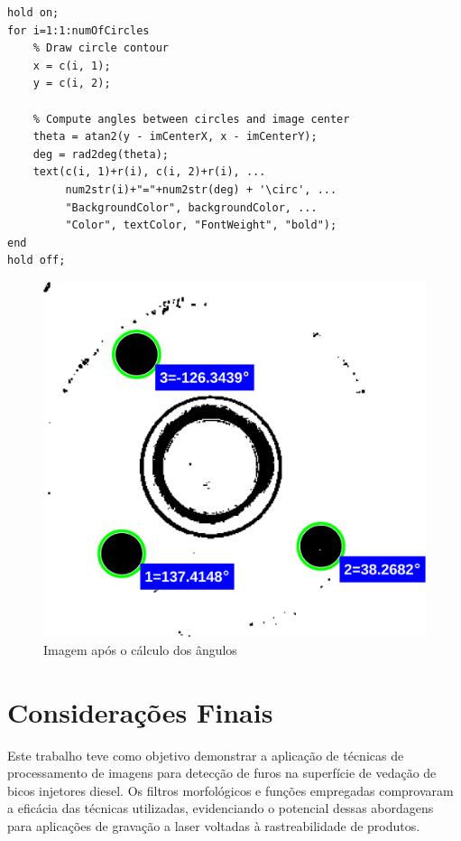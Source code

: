 \documentclass[conference]{IEEEtran}
\begin{document}
\begin{lstlisting}[caption={Cálculo dos ângulos em relação ao centro da imagem}, label={lst:codigo-compute-angle}]
hold on;
for i=1:1:numOfCircles
	% Draw circle contour
	x = c(i, 1);
	y = c(i, 2);
	
	% Compute angles between circles and image center 
	theta = atan2(y - imCenterX, x - imCenterY);
	deg = rad2deg(theta);
	text(c(i, 1)+r(i), c(i, 2)+r(i), ...
		 num2str(i)+"="+num2str(deg) + '\circ', ...
		 "BackgroundColor", backgroundColor, ...
		 "Color", textColor, "FontWeight", "bold");
end
hold off;
\end{lstlisting}

\begin{figure}[b]
	\centering
	\includegraphics[scale=0.65]{Images/Image0000_computed.png}
	\caption{Imagem após o cálculo dos ângulos}
	\label{fig:compute-angle}
\end{figure}

\section*{Considerações Finais}
Este trabalho teve como objetivo demonstrar a aplicação de técnicas de processamento de imagens para detecção de furos na superfície de vedação de bicos injetores diesel. Os filtros morfológicos e funções empregadas comprovaram a eficácia das técnicas utilizadas, evidenciando o potencial dessas abordagens para aplicações de gravação a laser voltadas à rastreabilidade de produtos.
\end{document}
